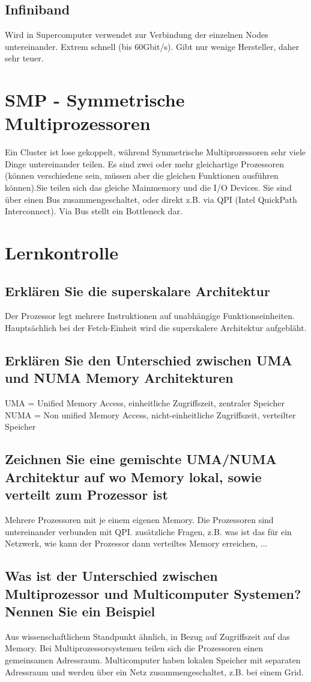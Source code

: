 \subsection{Infiniband}
Wird in Supercomputer verwendet zur Verbindung der einzelnen Nodes untereinander. Extrem schnell (bis 60Gbit/s). Gibt nur wenige Hersteller, daher sehr teuer.
\section{SMP - Symmetrische Multiprozessoren}
Ein Cluster ist lose gekoppelt, während Symmetrische Multiprozessoren sehr viele Dinge untereinander teilen. Es sind zwei oder mehr gleichartige Prozessoren (können verschiedene sein, müssen aber die gleichen Funktionen ausführen können).Sie teilen sich das gleiche Mainmemory und die I/O Devices. Sie sind über einen Bus zusammengeschaltet, oder direkt z.B. via QPI (Intel QuickPath Interconnect). Via Bus stellt ein Bottleneck dar.

\section{Lernkontrolle}
\subsection{Erklären Sie die superskalare Architektur}
Der Prozessor legt mehrere Instruktionen auf unabhängige Funktionseinheiten.
Hauptsächlich bei der Fetch-Einheit wird die superskalere Architektur aufgebläht.
\subsection{Erklären Sie den Unterschied zwischen UMA und NUMA Memory Architekturen}
UMA = Unified Memory Access, einheitliche Zugriffszeit, zentraler Speicher
NUMA = Non unified Memory Access, nicht-einheitliche Zugriffszeit, verteilter Speicher
\subsection{Zeichnen Sie eine gemischte UMA/NUMA Architektur auf wo Memory lokal, sowie verteilt zum Prozessor ist}
Mehrere Prozessoren mit je einem eigenen Memory. Die Prozessoren sind untereinander verbunden mit QPI.
zusätzliche Fragen, z.B. was ist das für ein Netzwerk, wie kann der Prozessor dann verteiltes Memory erreichen, ...
\subsection{Was ist der Unterschied zwischen Multiprozessor und Multicomputer Systemen? Nennen Sie ein Beispiel}
Aus wissenschaftlichem Standpunkt ähnlich, in Bezug auf Zugriffszeit auf das Memory.
Bei Multiprozessorsystemen teilen sich die Prozessoren einen gemeinsamen Adressraum.
Multicomputer haben lokalen Speicher mit separaten Adressraum und werden über ein Netz zusammengeschaltet, z.B. bei einem Grid.
